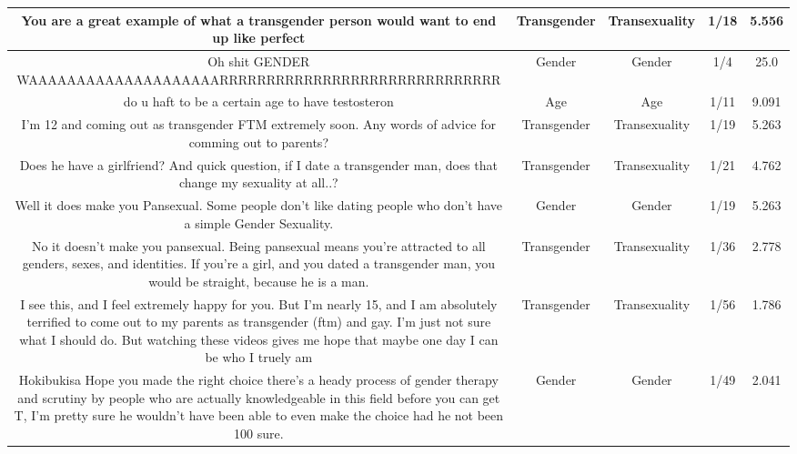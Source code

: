 \documentclass[11pt]{article}
\newlength\mylength
\begin{document}
\begin{center}
\begin{longtable}{|C{.40\mylength}|C{.30\mylength}|C{.15\mylength}|C{.15\mylength}|C{.15\mylength}|}
  You are a great example of what a transgender person would want to end up like   perfect  & Transgender & Transexuality & 1/18 & 5.556 \\  \hline
  Oh shit GENDER WAAAAAAAAAAAAAAAAAAAARRRRRRRRRRRRRRRRRRRRRRRRRRRRRR  & Gender & Gender & 1/4 & 25.0 \\  \hline
  do u haft to be a certain age to have testosteron  & Age & Age & 1/11 & 9.091 \\  \hline
  I'm 12 and coming out as transgender FTM extremely soon. Any words of advice for comming out to parents?  & Transgender & Transexuality & 1/19 & 5.263 \\  \hline
  Does he have a girlfriend? And quick question, if I date a transgender man, does that change my sexuality at all..?  & Transgender & Transexuality & 1/21 & 4.762 \\  \hline
  Well it does make you Pansexual. Some people don't like dating people who don't have a simple Gender Sexuality.  & Gender & Gender & 1/19 & 5.263 \\  \hline
  No it doesn't make you pansexual. Being pansexual means you're attracted to all genders, sexes, and identities. If you're a girl, and you dated a transgender man, you would be straight, because he is a man.  & Transgender & Transexuality & 1/36 & 2.778 \\  \hline
  I see this, and I feel extremely happy for you. But I'm nearly 15, and I am absolutely terrified to come out to my parents as transgender (ftm) and gay. I'm just not sure what I should do. But watching these videos gives me hope that maybe one day I can be who I truely am  & Transgender & Transexuality & 1/56 & 1.786 \\  \hline
   Hokibukisa  Hope you made the right choice  there's a heady process of gender therapy and scrutiny by people who are actually knowledgeable in this field before you can get T, I'm pretty sure he wouldn't have been able to even make the choice had he not been 100  sure.  & Gender & Gender & 1/49 & 2.041 \\  \hline

\end{longtable}
\end{center}
\end{document}
